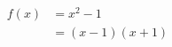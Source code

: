 \documentclass[10pt]{article}
\begin{document}
\begin{align*}
	f(x) &= x^2 - 1\\
	     &= (x - 1)(x + 1)
\end{align*}
\end{document}
